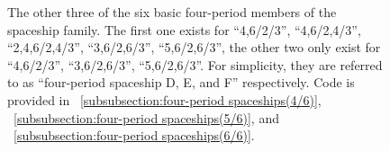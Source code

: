 \documentclass[12pt]{article}
\numberwithin{figure}{section} %
\begin{document}
\begin{figure}[H]
\begin{subfigure}{0.18\textwidth}
     		\subcaption{}
   	\end{subfigure}
      	\newline
   	\setcounter{subfigure}{0}
   	\caption[Another three four-period spaceships]{The other three of the six basic four-period members of the spaceship family. The first one exists for “4,6/2/3”, “4,6/2,4/3”, “2,4,6/2,4/3”, “3,6/2,6/3”, “5,6/2,6/3”, the other two only exist for “4,6/2/3”, “3,6/2,6/3”, “5,6/2,6/3”. For simplicity, they are referred to as “four-period spaceship D, E, and F” respectively. Code is provided in ~\ref{subsubsection:four-period spaceships(4/6)}, ~\ref{subsubsection:four-period spaceships(5/6)}, and ~\ref{subsubsection:four-period spaceships(6/6)}.}
   	\label{fig:four-period spaceships second half}
   	\vspace{-1.5em}
\end{figure}
\end{document}
